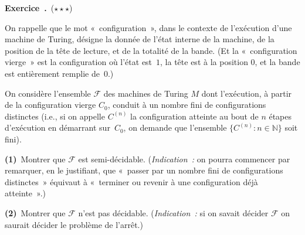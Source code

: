 \documentclass[12pt,a4paper]{article}
\theoremstyle{definition}
\newcommand\exercice{%
\refstepcounter{comcnt}\bigskip\noindent\textbf{Exercice~\thecomcnt.}}
\begin{document}
%



%

\exercice\ (${\star}{\star}{\star}$)\par\nobreak

On rappelle que le mot « configuration », dans le contexte de
l'exécution d'une machine de Turing, désigne la donnée de l'état
interne de la machine, de la position de la tête de lecture, et de la
totalité de la bande.  (Et la « configuration vierge » est la
configuration où l'état est $1$, la tête est à la position $0$, et la
bande est entièrement remplie de $0$.)

On considère l'ensemble $\mathscr{F}$ des machines de Turing $M$ dont
l'exécution, à partir de la configuration vierge $C_0$, conduit à un
nombre fini de configurations distinctes (i.e., si on appelle
$C^{(n)}$ la configuration atteinte au bout de $n$ étapes d'exécution
en démarrant sur $C_0$, on demande que l'ensemble $\{C^{(n)} : n\in
\mathbb{N}\}$ soit fini).

\textbf{(1)} Montrer que $\mathscr{F}$ est semi-décidable.
(\emph{Indication :} on pourra commencer par remarquer, en le
justifiant, que « passer par un nombre fini de configurations
distinctes » équivaut à « terminer ou revenir à une configuration déjà
atteinte ».)

\textbf{(2)} Montrer que $\mathscr{F}$ n'est pas décidable.
(\emph{Indication :} si on savait décider $\mathscr{F}$ on saurait
décider le problème de l'arrêt.)
\end{document}
